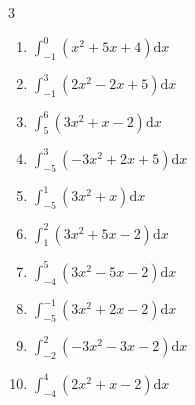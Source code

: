 \begin{multicols}{3}
\begin{enumerate}
  \item $\displaystyle \int_{-1}^{0}\left( x^{2}+5x+4 \right) \mathrm{d}x$


  \item $\displaystyle \int_{-1}^{3}\left( 2x^{2}-2x+5 \right) \mathrm{d}x$

        \phantom{$\displaystyle =14$}

  \item $\displaystyle \int_{5}^{6}\left( 3x^{2}+x-2 \right) \mathrm{d}x$


\columnbreak %

\resetques

  \item $\displaystyle \int_{-5}^{3}\left( -3x^{2}+2x+5 \right) \mathrm{d}x$


  \item $\displaystyle \int_{-5}^{1}\left( 3x^{2}+x \right) \mathrm{d}x$

        \phantom{$\displaystyle =114$}

  \item $\displaystyle \int_{1}^{2}\left( 3x^{2}+5x-2 \right) \mathrm{d}x$


  \item $\displaystyle \int_{-4}^{5}\left( 3x^{2}-5x-2 \right) \mathrm{d}x$


  \item $\displaystyle \int_{-5}^{-1}\left( 3x^{2}+2x-2 \right) \mathrm{d}x$


\columnbreak %

  \item $\displaystyle \int_{-2}^{2}\left( -3x^{2}-3x-2 \right) \mathrm{d}x$


  \item $\displaystyle \int_{-4}^{4}\left( 2x^{2}+x-2 \right) \mathrm{d}x$



\end{enumerate}
\end{multicols}
